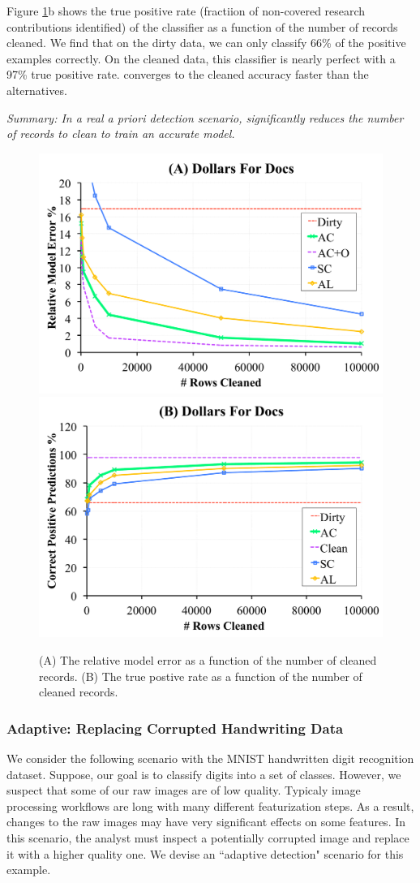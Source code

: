 Figure \ref{dfd}b shows the true positive rate (fractiion of non-covered research contributions identified) of the classifier as a function of the number of records cleaned. 
We find that on the dirty data, we can only classify 66\% of the positive examples correctly.
On the cleaned data, this classifier is nearly perfect with a 97\% true positive rate.
\sys converges to the cleaned accuracy faster than the alternatives.

\vspace{0.25em}

\noindent \emph{Summary: In a real a priori detection scenario, \sys significantly reduces the number of records to clean to train an accurate model. }

\begin{figure}[ht!]
\centering
 \includegraphics[width=0.49\columnwidth]{exp/exp13a.pdf}
 \includegraphics[width=0.49\columnwidth]{exp/exp13b.pdf}
 \caption{(A) The relative model error as a function of the number of cleaned records. (B) The true postive rate as a function of the number of cleaned records. \label{dfd}}
\end{figure}

\subsubsection{Adaptive: Replacing Corrupted Handwriting Data}
We consider the following scenario with the MNIST handwritten digit recognition dataset.
Suppose, our goal is to classify digits into a set of classes.
However, we suspect that some of our raw images are of low quality.
Typicaly image processing workflows are long with many different featurization steps.
As a result, changes to the raw images may have very significant effects on some features.
In this scenario, the analyst must inspect a potentially corrupted image and replace it with a higher quality one.
We devise an ``adaptive detection" \sys scenario for this example.

